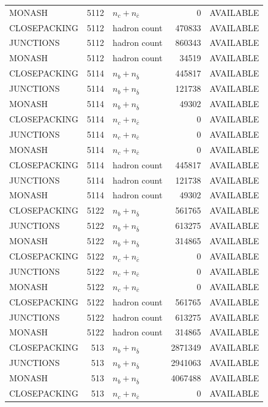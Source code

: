 \begin{landscape}
\begin{longtable}{@{}lrlrl@{}}
MONASH & 5112 & $n_c+n_{\bar c}$ & \num{0} & AVAILABLE \\
CLOSEPACKING & 5112 & hadron count & \num{470833} & AVAILABLE \\
JUNCTIONS & 5112 & hadron count & \num{860343} & AVAILABLE \\
MONASH & 5112 & hadron count & \num{34519} & AVAILABLE \\
CLOSEPACKING & 5114 & $n_b+n_{\bar b}$ & \num{445817} & AVAILABLE \\
JUNCTIONS & 5114 & $n_b+n_{\bar b}$ & \num{121738} & AVAILABLE \\
MONASH & 5114 & $n_b+n_{\bar b}$ & \num{49302} & AVAILABLE \\
CLOSEPACKING & 5114 & $n_c+n_{\bar c}$ & \num{0} & AVAILABLE \\
JUNCTIONS & 5114 & $n_c+n_{\bar c}$ & \num{0} & AVAILABLE \\
MONASH & 5114 & $n_c+n_{\bar c}$ & \num{0} & AVAILABLE \\
CLOSEPACKING & 5114 & hadron count & \num{445817} & AVAILABLE \\
JUNCTIONS & 5114 & hadron count & \num{121738} & AVAILABLE \\
MONASH & 5114 & hadron count & \num{49302} & AVAILABLE \\
CLOSEPACKING & 5122 & $n_b+n_{\bar b}$ & \num{561765} & AVAILABLE \\
JUNCTIONS & 5122 & $n_b+n_{\bar b}$ & \num{613275} & AVAILABLE \\
MONASH & 5122 & $n_b+n_{\bar b}$ & \num{314865} & AVAILABLE \\
CLOSEPACKING & 5122 & $n_c+n_{\bar c}$ & \num{0} & AVAILABLE \\
JUNCTIONS & 5122 & $n_c+n_{\bar c}$ & \num{0} & AVAILABLE \\
MONASH & 5122 & $n_c+n_{\bar c}$ & \num{0} & AVAILABLE \\
CLOSEPACKING & 5122 & hadron count & \num{561765} & AVAILABLE \\
JUNCTIONS & 5122 & hadron count & \num{613275} & AVAILABLE \\
MONASH & 5122 & hadron count & \num{314865} & AVAILABLE \\
CLOSEPACKING & 513 & $n_b+n_{\bar b}$ & \num{2871349} & AVAILABLE \\
JUNCTIONS & 513 & $n_b+n_{\bar b}$ & \num{2941063} & AVAILABLE \\
MONASH & 513 & $n_b+n_{\bar b}$ & \num{4067488} & AVAILABLE \\
CLOSEPACKING & 513 & $n_c+n_{\bar c}$ & \num{0} & AVAILABLE \\

\end{longtable}
\end{landscape}
